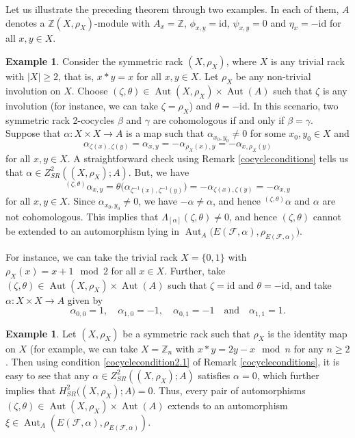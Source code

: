\documentclass[11pt,reqno]{amsart}
\theoremstyle{definition}
\newtheorem{example}[theorem]{Example}
\numberwithin{equation}{subsection}
\newcommand{\id}{\mathrm{id}}
\begin{document}
Let us illustrate the preceding theorem through two examples. In each of them, $A$ denotes a $\mathbb{Z}(X, \rho_{X})$-module with $A_x=\mathbb{Z}$, $\phi_{x, y}=\id$, $\psi_{x, y}=0$ and $\eta_{x}=-\id$ for all $x, y \in X$.

\begin{example} 
Consider the symmetric rack $(X, \rho_{X})$, where $X$ is any trivial rack with $|X|\geq 2$, that is, $x*y=x$ for all $x,y \in X$. Let $\rho_X$ be any non-trivial involution on $X$. Choose $(\zeta, \theta) \in \operatorname{Aut}(X, \rho_{X}) \times \operatorname{Aut}(A)$ such that $\zeta$ is any involution (for instance, we can take $\zeta = \rho_X$) and $\theta = -\id$.  In this scenario, two symmetric rack 2-cocycles $\beta$ and $\gamma$ are cohomologous if and only if  $\beta=\gamma$. Suppose that $\alpha: X \times X \rightarrow A$ is a map such that $\alpha_{x_0,y_0} \neq 0$ for some $x_0,y_0 \in X$ and $$\alpha_{\zeta(x),\zeta(y)}=\alpha_{x,y}=-\alpha_{\rho_X(x),y}=-\alpha_{x,\rho_X(y)}$$ for all $x,y\in X$. A straightforward check using Remark \ref{cocycleconditions} tells us that $\alpha \in Z_{SR}^{2}((X, \rho_{X}); A)$. But, we have
	$$
		{}^{(\zeta, \theta)}\alpha_{x, y} = \theta \big(\alpha_{\zeta^{-1}(x), \zeta^{-1}(y)} \big) = -\alpha_{\zeta(x), \zeta(y)}  = -\alpha_{x, y}
	$$
for all $x, y \in X$.	 Since $\alpha_{x_0,y_0} \neq 0$, we have $-\alpha \neq \alpha$, and hence ${}^{(\zeta, \theta)}\alpha$ and $\alpha$ are not cohomologous. This implies that $\Lambda_{[\alpha]}(\zeta,\theta) \neq 0$, and hence $(\zeta,\theta)$ cannot be extended to an automorphism lying in $\operatorname{Aut}_{A} \big(E(\mathcal{F}, \alpha), \rho_{E(\mathcal{F}, \alpha)} \big)$.
\par
For instance, we can take the trivial rack $X= \{ 0, 1 \}$ with $\rho_X(x)=x+1 \mod 2$ for all $x \in X$. Further, take $(\zeta, \theta) \in \operatorname{Aut}(X, \rho_{X}) \times \operatorname{Aut}(A)$ such that $\zeta = \id$ and $\theta = -\id$, and take $\alpha: X \times X \rightarrow A$ given by
	 $$	 \alpha_{0,0} = 1, \quad \alpha_{1,0} = -1, \quad \alpha_{0,1} = -1 \quad \textrm{and} \quad \alpha_{1, 1} = 1. $$
\end{example}


\begin{example}
Let $(X,\rho_X)$ be a symmetric rack such that $\rho_X$ is the identity map on $X$ (for example,  we can take $X=\mathbb{Z}_n$ with $x*y=2y-x \mod n$ for any $n \geq 2$. Then using condition \eqref{cocyclecondition2.1} of Remark \ref{cocycleconditions}, it is easy to see that any $\alpha \in Z_{SR}^{2}((X, \rho_{X}); A)$ satisfies $\alpha=0$, which further implies that $H_{SR}^{2} \big((X,\rho_{X});A \big)=0$. Thus, every pair of automorphisms $(\zeta,\theta) \in \operatorname{Aut}(X, \rho_{X}) \times\operatorname{Aut}(A)$ extends to an automorphism $\xi \in \operatorname{Aut}_{A}(E(\mathcal{F}, \alpha), \rho_{E(\mathcal{F}, \alpha)})$.

\end{example}
\end{document}
